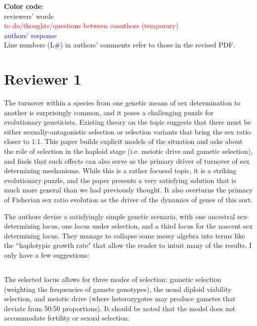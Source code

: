 \documentclass[10pt,letterpaper]{article}
\begin{document}
\noindent\textbf{Color code}:\\
reviewers' words\\
\textcolor{red}{to do/thoughts/questions between coauthors (temporary)}\\
\textcolor{blue}{authors' response}
\\

\noindent  Line numbers (L\#) in authors' comments refer to those in the revised PDF.

\section{Reviewer 1}

The turnover within a species from one genetic means of sex determination to another is surprisingly common, and it poses a challenging puzzle for evolutionary geneticists.  Existing theory on the topic suggests that there must be either sexually-antagonistic selection or selection variants that bring the sex ratio closer to 1:1.  This paper builds explicit models of the situation and asks about the role of selection in the haploid stage (i.e. meiotic drive and gametic selection), and finds that such effects can also serve as the primary driver of turnover of sex determining mechanisms.  While this is a rather focused topic, it is a striking evolutionary puzzle, and the paper presents a very satisfying solution that is much more general than we had previously thought.  It also overturns the primacy of Fisherian sex ratio evolution as the driver of the dynamics of genes of this sort.

The authors devise a satisfyingly simple genetic scenario, with one ancestral sex-determining locus, one locus under selection, and a third locus for the nascent sex determining locus.  They manage to collapse some messy algebra into terms like the ``haplotypic growth rate" that allow the reader to intuit many of the results.  I only have a few suggestions:

\noindent\subsection{}
The selected locus allows for three modes of selection: gametic selection (weighting the frequencies of gamete genotypes), the usual diploid viability selection, and meiotic drive (where heterozygotes may produce gametes that deviate from 50:50 proportions).  It should be noted that the model does not accommodate fertility or sexual selection.
\end{document}
